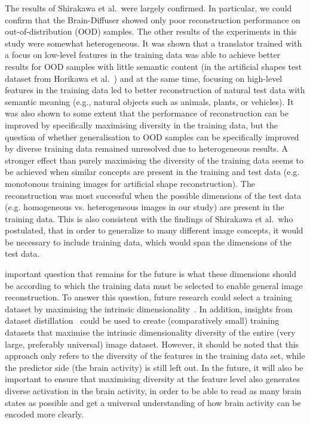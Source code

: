 The results of Shirakawa et al.\ were largely confirmed. In particular, we could confirm that the Brain-Diffuser showed only poor reconstruction performance on out-of-distribution (OOD) samples. The other results of the experiments in this study were somewhat heterogeneous. It was shown that a translator trained with a focus on low-level features in the training data was able to achieve better results for OOD samples with little semantic content (in the artificial shapes test dataset from Horikawa et al.~\cite{horikawaGenericDecodingSeen2017}) and at the same time, focusing on high-level features in the training data led to better reconstruction of natural test data with semantic meaning (e.g., natural objects such as animals, plants, or vehicles). It was also shown to some extent that the performance of reconstruction can be improved by specifically maximising diversity in the training data, but the question of whether generalisation to OOD samples can be specifically improved by diverse training data remained unresolved due to heterogeneous results. A stronger effect than purely maximising the diversity of the training data seems to be achieved when similar concepts are present in the training and test data (e.g. monotonous training images for artificial shape reconstruction). The reconstruction was most successful when the possible dimensions of the test data (e.g. homogeneous vs. heterogeneous images in our study) are present in the training data. This is also consistent with the findings of Shirakawa et al.\ who postulated, that in order to generalize to many different image concepts, it would be necessary to include training data, which would span the dimensions of the test data.

 important question that remains for the future is what these dimensions should be according to which the training data must be selected to enable general image reconstruction. To answer this question, future research could select a training dataset by maximising the intrinsic dimensionality~\cite{popeIntrinsicDimensionImages2021}. In addition, insights from dataset distillation~\cite{wangDatasetDistillation2018} could be used to create (comparatively small) training datasets that maximise the intrinsic dimensionality diversity of the entire (very large, preferably universal) image dataset. However, it should be noted that this approach only refers to the diversity of the features in the training data set, while the predictor side (the brain activity) is still left out. In the future, it will also be important to ensure that maximising diversity at the feature level also generates diverse activation in the brain activity, in order to be able to read as many brain states as possible and get a universal understanding of how brain activity can be encoded more clearly.
